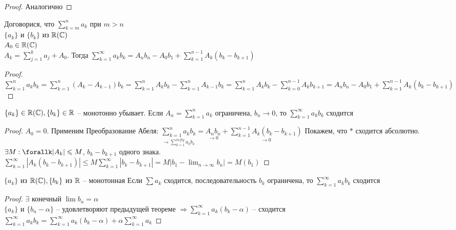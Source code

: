\begin{proof}
	Аналогично
\end{proof}

\begin{Lm}
	Договорися, что $\sum_{k=m}^{n} a_k$ при $m > n$\\
	$\{a_k\}$ и $\{b_k\}$ из $\mathbb{R} (\mathbb{C})$\\
	$A_0 \in \mathbb{R} (\mathbb{C})$\\
	$A_k = \sum_{j=1}^{k} a_j + A_0$. Тогда
	$\sum_{k=1}^{\infty} a_k b_k = A_n b_n - A_0 b_1 + \sum_{k=1}^{n-1} A_k (b_k - b_{k+1})$
\end{Lm}

\begin{proof}
	$\sum_{k=1}^{n} a_kb_k = \sum_{k=1}^{n} (A_k - A_{k-1}) b_k = \sum_{k=1}^{n} A_kb_k - \sum_{k=1}^{n} A_{k-1} b_k =
	\sum_{k=1}^{n} A_k b_k - \sum_{k=0}^{n-1} A_k b_{k+1} = A_n b_n - A_0 b_1 + \sum_{k=1}^{n-1} A_k(b_k - b_{k+1})$
\end{proof}

\begin{Thm} 
	$\{a_k\} \in \mathbb{R} (\mathbb{C}), \{b_k\} \in \mathbb{R}$ -- монотонно убывает. 
	Если $A_n = \sum_{k=1}^{n} a_k$ ограничена, $b_n \to 0$, то $\sum_{k=1}^{\infty} a_kb_k$ сходится 
\end{Thm} 

\begin{proof}
	$A_0 = 0$. Применим Преобразование Абеля: $\underset{\to \sum_{k=1}^{infty} a_kb_k}{\sum_{k=1}^{n} a_kb_k} = \underset{\to 0}{A_nb_n}   + \underset{\to 0}{\sum_{k=1}^{n-1} A_k(b_k - b_{k+1})}$
	Покажем, что $*$ сходится абсолютно.\\
	$\exists M: \forallk |A_k| \leqslant M$, $b_k - b_{k+1}$ одного знака.\\
	$\sum_{k=1}^{\infty} |A_k(b_k - b_{k+1})| \leqslant M \sum_{k=1}^{\infty} |b_k - b_{k+1}| = 
	M |b_1 - \lim_{n \to \infty} b_n| = M(b_1)$
\end{proof}

\begin{Thm} 
	$\{a_k\}$ из $\mathbb{R} (\mathbb{C}), \{b_k\}$ из $\mathbb{R}$ -- монотонная
	Если $\sum a_k$ сходится, последовательность $b_k$ ограничена, то $\sum_{k=1}^{\infty} a_k b_k$ сходится
\end{Thm} 

\begin{proof}
	$\exists$ конечный $\lim b_n = \alpha$\\
	$\{a_k\}$ и $\{b_n - \alpha\}$ -- удовлетворяют предыдущей теореме $\Rightarrow
	\sum_{k=1}^{\infty} a_k (b_k - \alpha)$ -- сходится\\
	$\sum_{k=1}^{\infty} a_k b_k = \sum_{k=1}^{\infty} a_k (b_k - \alpha) + \alpha \sum_{k=1}^{\infty} a_k$
\end{proof}

